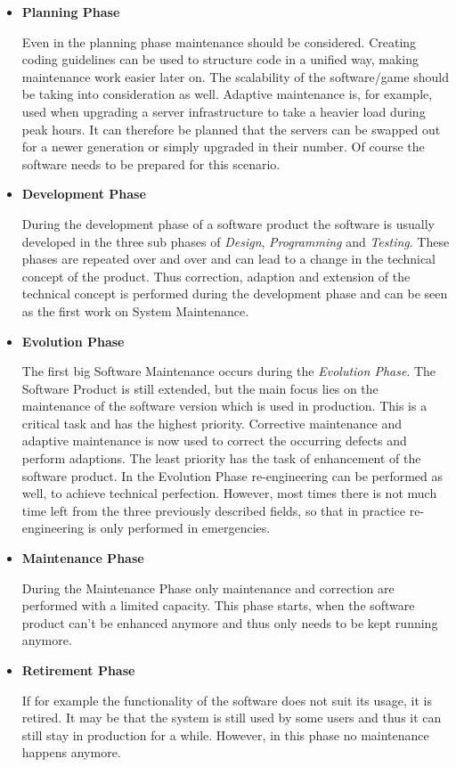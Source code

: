\begin{itemize}
    \item \textbf{Planning Phase}

    Even in the planning phase maintenance should be considered. Creating coding guidelines can be used to structure code in a unified way, making maintenance work easier later on. The scalability of the software/game should be taking into consideration as well. Adaptive maintenance is, for example, used when upgrading a server infrastructure to take a heavier load during peak hours. It can therefore be planned that the servers can be swapped out for a newer generation or simply upgraded in their number. Of course the software needs to be prepared for this scenario.

    \item \textbf{Development Phase}

    During the development phase of a software product the software is usually developed in the three sub phases of \textit{Design}, \textit{Programming} and \textit{Testing}. These phases are repeated over and over and can lead to a change in the technical concept of the product. Thus correction, adaption and extension of the technical concept is performed during the development phase and can be seen as the first work on System Maintenance.\citep{pigoski_software_2015}

    \item \textbf{Evolution Phase}

    The first big Software Maintenance occurs during the \textit{Evolution Phase}. The Software Product is still extended, but the main focus lies on the maintenance of the software version which is used in production. This is a critical task and has the highest priority. Corrective maintenance and adaptive maintenance is now used to correct the occurring defects and perform adaptions. The least priority has the task of enhancement of the software product. In the Evolution Phase re-engineering can be performed as well, to achieve technical perfection. However, most times there is not much time left from the three previously described fields, so that in practice re-engineering is only performed in emergencies.\citep{pigoski_software_2015}

    \item \textbf{Maintenance Phase}

    During the Maintenance Phase only maintenance and correction are performed with a limited capacity. This phase starts, when the software product can't be enhanced anymore and thus only needs to be kept running anymore.\citep{pigoski_software_2015}

    \item \textbf{Retirement Phase}

    If for example the functionality of the software does not suit its usage, it is retired. It may be that the system is still used by some users and thus it can still stay in production for a while. However, in this phase no maintenance happens anymore.\citep{sneed_software_2005}
\end{itemize}

